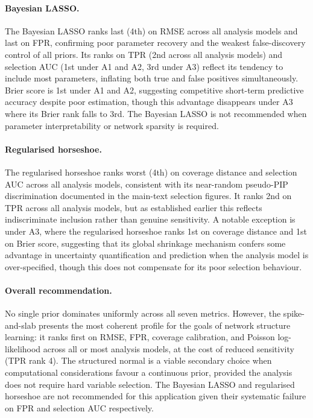 \documentclass[12pt]{article}
\begin{document}
\paragraph{Bayesian LASSO.}
The Bayesian LASSO ranks last (4th) on RMSE across all analysis models and
last on FPR, confirming poor parameter recovery and the weakest
false-discovery control of all priors. Its ranks on TPR (2nd across all
analysis models) and selection AUC (1st under A1 and A2, 3rd under A3) reflect
its tendency to include most parameters, inflating both true and false
positives simultaneously. Brier score is 1st under A1 and A2, suggesting
competitive short-term predictive accuracy despite poor estimation, though
this advantage disappears under A3 where its Brier rank falls to 3rd. The
Bayesian LASSO is not recommended when parameter interpretability or network
sparsity is required.

\paragraph{Regularised horseshoe.}
The regularised horseshoe ranks worst (4th) on coverage distance and selection
AUC across all analysis models, consistent with its near-random pseudo-PIP
discrimination documented in the main-text selection figures. It ranks 2nd
on TPR across all analysis models, but as established earlier this reflects
indiscriminate inclusion rather than genuine sensitivity. A notable exception
is under A3, where the regularised horseshoe ranks 1st on coverage distance
and 1st on Brier score, suggesting that its global shrinkage mechanism
confers some advantage in uncertainty quantification and prediction when the
analysis model is over-specified, though this does not compensate for its
poor selection behaviour.

\paragraph{Overall recommendation.}
No single prior dominates uniformly across all seven metrics. However, the
spike-and-slab presents the most coherent profile for the goals of network
structure learning: it ranks first on RMSE, FPR, coverage calibration, and
Poisson log-likelihood across all or most analysis models, at the cost of
reduced sensitivity (TPR rank 4). The structured normal is a viable secondary
choice when computational considerations favour a continuous prior, provided
the analysis does not require hard variable selection. The Bayesian LASSO and
regularised horseshoe are not recommended for this application given their
systematic failure on FPR and selection AUC respectively.
\end{document}
